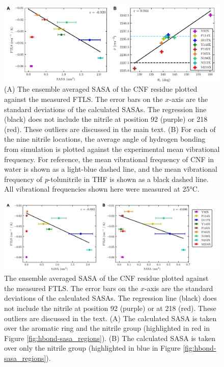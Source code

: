 \begin{figure}
    \center
    \includegraphics[width=\double]{figures-gfp-hbond/Figure8_combined.pdf}
    \caption{
        (A) The ensemble averaged SASA of the CNF residue plotted against the measured FTLS. 
        The error bars on the $x$-axis are the standard deviations of the calculated SASAs. 
        The regression line (black) does not include the nitrile at position 92 (purple) or 218 (red). 
        These outliers are discussed in the main text. 
        (B) For each of the nine nitrile locations, the average angle of hydrogen bonding from simulation is plotted against the experimental mean vibrational frequency. 
        For reference, the mean vibrational frequency of CNF in water is shown as a light-blue dashed line, and the mean vibrational frequency of \emph{p}-tolunitrile in THF is shown as a black dashed line. 
        All vibrational frequencies shown here were measured at 25\si{\celsius}.
    }
    \label{fig:hbond-comparison}
\end{figure}

\begin{figure}
    \center
    \includegraphics[width=\double]{figures-gfp-hbond/FigureS3_combined.png}
    \caption{
        The ensemble averaged SASA of the CNF residue plotted against the measured FTLS. 
        The error bars on the $x$-axis are the standard deviations of the calculated SASAs. 
        The regression line (black) does not include the nitrile at position 92 (purple) or at 218 (red). 
        These outliers are discussed in the text. 
        (A) The calculated SASA is taken over the aromatic ring and the nitrile group (highlighted in red in Figure \ref{fig:hbond-sasa_regions}). 
        (B) The calculated SASA is taken over only the nitrile group (highlighted in blue in Figure \ref{fig:hbond-sasa_regions}).
    }
    \label{fig:hbond-regions_v_FTLS}
\end{figure}

